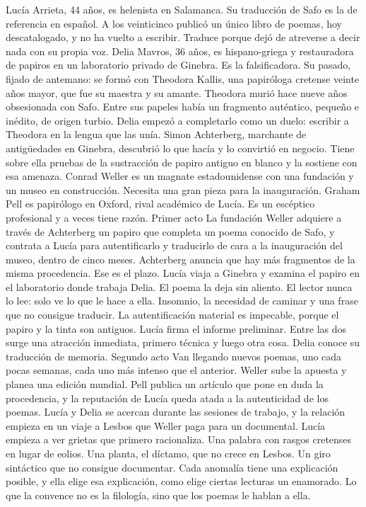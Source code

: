 Lucía Arrieta, 44 años, es helenista en Salamanca. Su traducción de Safo es la de referencia en español. A los veinticinco publicó un único libro de poemas, hoy descatalogado, y no ha vuelto a escribir. Traduce porque dejó de atreverse a decir nada con su propia voz.
Delia Mavros, 36 años, es hispano-griega y restauradora de papiros en un laboratorio privado de Ginebra. Es la falsificadora.
Su pasado, fijado de antemano: se formó con Theodora Kallis, una papiróloga cretense veinte años mayor, que fue su maestra y su amante. Theodora murió hace nueve años obsesionada con Safo. Entre sus papeles había un fragmento auténtico, pequeño e inédito, de origen turbio. Delia empezó a completarlo como un duelo: escribir a Theodora en la lengua que las unía. Simon Achterberg, marchante de antigüedades en Ginebra, descubrió lo que hacía y lo convirtió en negocio. Tiene sobre ella pruebas de la sustracción de papiro antiguo en blanco y la sostiene con esa amenaza.
Conrad Weller es un magnate estadounidense con una fundación y un museo en construcción. Necesita una gran pieza para la inauguración.
Graham Pell es papirólogo en Oxford, rival académico de Lucía. Es un escéptico profesional y a veces tiene razón.
Primer acto
La fundación Weller adquiere a través de Achterberg un papiro que completa un poema conocido de Safo, y contrata a Lucía para autentificarlo y traducirlo de cara a la inauguración del museo, dentro de cinco meses. Achterberg anuncia que hay más fragmentos de la misma procedencia. Ese es el plazo.
Lucía viaja a Ginebra y examina el papiro en el laboratorio donde trabaja Delia. El poema la deja sin aliento. El lector nunca lo lee: solo ve lo que le hace a ella. Insomnio, la necesidad de caminar y una frase que no consigue traducir. La autentificación material es impecable, porque el papiro y la tinta son antiguos. Lucía firma el informe preliminar.
Entre las dos surge una atracción inmediata, primero técnica y luego otra cosa. Delia conoce su traducción de memoria.
Segundo acto
Van llegando nuevos poemas, uno cada pocas semanas, cada uno más intenso que el anterior. Weller sube la apuesta y planea una edición mundial. Pell publica un artículo que pone en duda la procedencia, y la reputación de Lucía queda atada a la autenticidad de los poemas. Lucía y Delia se acercan durante las sesiones de trabajo, y la relación empieza en un viaje a Lesbos que Weller paga para un documental.
Lucía empieza a ver grietas que primero racionaliza. Una palabra con rasgos cretenses en lugar de eolios. Una planta, el díctamo, que no crece en Lesbos. Un giro sintáctico que no consigue documentar. Cada anomalía tiene una explicación posible, y ella elige esa explicación, como elige ciertas lecturas un enamorado. Lo que la convence no es la filología, sino que los poemas le hablan a ella.
